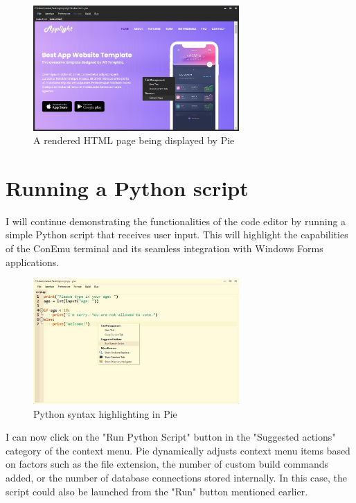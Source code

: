 \begin{figure}[h]
\centering
\includegraphics[width=0.7\textwidth]{images/render-output.jpg}
\caption{A rendered HTML page being displayed by Pie}
\label{fig:fig2,1.}
\end{figure}

\section{Running a Python script}

I will continue demonstrating the functionalities of the code editor by running a simple Python script that receives user input. This will highlight the capabilities of the ConEmu terminal and its seamless integration with Windows Forms applications.

\begin{figure}[H]
\centering
\includegraphics[width=0.7\textwidth]{images/python.jpg}
\caption{Python syntax highlighting in Pie}
\label{fig:fig2,1.}
\end{figure}

I can now click on the "Run Python Script" button in the "Suggested actions" category of the context menu. Pie dynamically adjusts context menu items based on factors such as the file extension, the number of custom build commands added, or the number of database connections stored internally. In this case, the script could also be launched from the "Run" button mentioned earlier.


